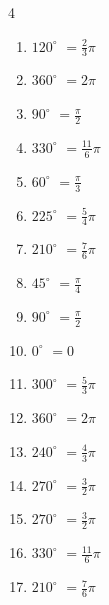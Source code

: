 \begin{multicols}{4}
\begin{enumerate}
  \item $\displaystyle 120^{\circ}$
        $\displaystyle =\frac{2}{3}\pi$

  \item $\displaystyle 360^{\circ}$
        $\displaystyle =2\pi$

  \item $\displaystyle 90^{\circ}$
        $\displaystyle =\frac{\pi}{2}$

  \item $\displaystyle 330^{\circ}$
        $\displaystyle =\frac{11}{6}\pi$

  \item $\displaystyle 60^{\circ}$
        $\displaystyle =\frac{\pi}{3}$

  \item $\displaystyle 225^{\circ}$
        $\displaystyle =\frac{5}{4}\pi$

  \item $\displaystyle 210^{\circ}$
        $\displaystyle =\frac{7}{6}\pi$

  \item $\displaystyle 45^{\circ}$
        $\displaystyle =\frac{\pi}{4}$

  \item $\displaystyle 90^{\circ}$
        $\displaystyle =\frac{\pi}{2}$

  \item $\displaystyle 0^{\circ}$
        $\displaystyle =0$

  \item $\displaystyle 300^{\circ}$
        $\displaystyle =\frac{5}{3}\pi$

  \item $\displaystyle 360^{\circ}$
        $\displaystyle =2\pi$

\columnbreak %

\resetques

  \item $\displaystyle 240^{\circ}$
        $\displaystyle =\frac{4}{3}\pi$

  \item $\displaystyle 270^{\circ}$
        $\displaystyle =\frac{3}{2}\pi$

  \item $\displaystyle 270^{\circ}$
        $\displaystyle =\frac{3}{2}\pi$

  \item $\displaystyle 330^{\circ}$
        $\displaystyle =\frac{11}{6}\pi$

  \item $\displaystyle 210^{\circ}$
        $\displaystyle =\frac{7}{6}\pi$


\end{enumerate}
\end{multicols}
